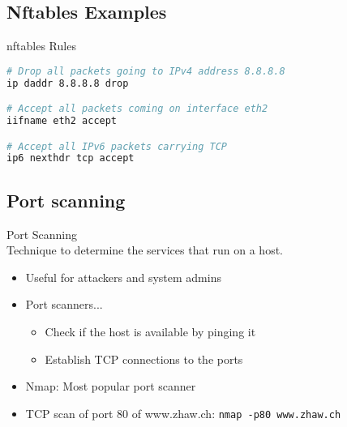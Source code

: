 
\subsection{Nftables Examples}

\begin{examplecode}{nftables Rules}\\
\begin{lstlisting}[language=bash, style=basesmol]
# Drop all packets going to IPv4 address 8.8.8.8
ip daddr 8.8.8.8 drop

# Accept all packets coming on interface eth2
iifname eth2 accept

# Accept all IPv6 packets carrying TCP
ip6 nexthdr tcp accept
\end{lstlisting}
\end{examplecode}

\subsection{Port scanning}

\begin{definition}{Port Scanning}\\
    Technique to determine the services that run on a host.
    \begin{itemize}
        \item Useful for attackers and system admins
        \item Port scanners...
        \begin{itemize}
            \item Check if the host is available by pinging it
            \item Establish TCP connections to the ports
        \end{itemize}
        \item Nmap: Most popular port scanner
        \item TCP scan of port 80 of www.zhaw.ch: \texttt{nmap -p80 www.zhaw.ch}
    \end{itemize}
\end{definition}